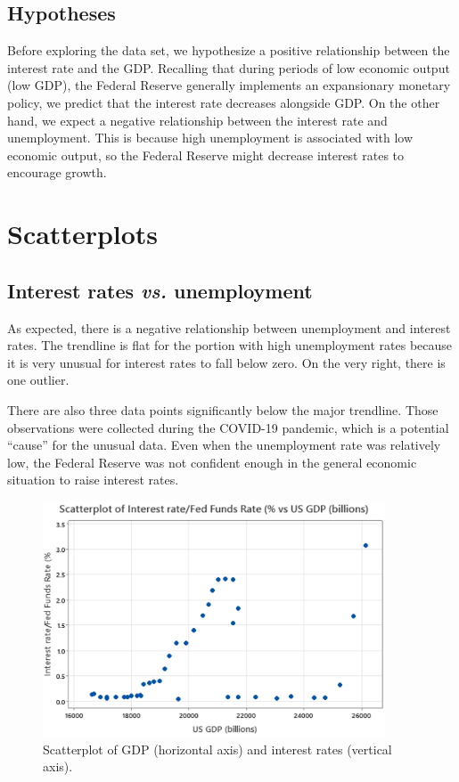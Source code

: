 \documentclass[12pt]{article}
\begin{document}
\subsection{Hypotheses}
Before exploring the data set, we hypothesize a positive relationship between the interest rate and the GDP. Recalling that during periods of low economic output (low GDP), the Federal Reserve generally implements an expansionary monetary policy, we predict that the interest rate decreases alongside GDP. On the other hand, we expect a negative relationship between the interest rate and unemployment. This is because high unemployment is associated with low economic output, so the Federal Reserve might decrease interest rates to encourage growth.

\section{Scatterplots}
\subsection{Interest rates \emph{vs.} unemployment}

As expected, there is a negative relationship between unemployment and interest rates. The trendline is flat for the portion with high unemployment rates because it is very unusual for interest rates to fall below zero. On the very right, there is one outlier.

There are also three data points significantly below the major trendline. Those observations were collected during the COVID-19 pandemic, which is a potential ``cause'' for the unusual data. Even when the unemployment rate was relatively low, the Federal Reserve was not confident enough in the general economic situation to raise interest rates.
\begin{figure}[ht]
\begin{center}
\includegraphics[width=4in]{images/gdp-scatterplot.png}
\end{center}
\caption{Scatterplot of GDP (horizontal axis) and interest rates (vertical axis).
\label{fig:gdpscatterplot}}
\end{figure}
\end{document}
